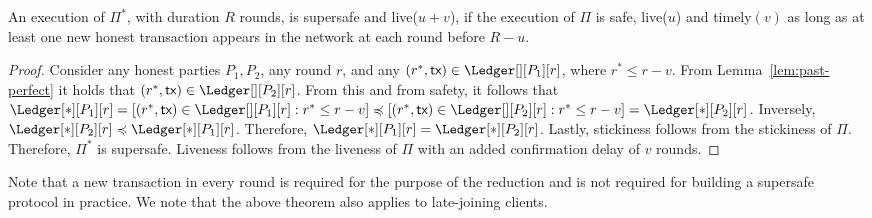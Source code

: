 \begin{theorem} \label{thm:timeliness-to-supersafety}
  An execution of $\Pi^*$, with duration $R$ rounds, is supersafe
  and live($u + v$), if the execution of
  $\Pi$ is safe, live($u$) and timely$(v)$
  as long as at least one new honest transaction appears in the
  network at each round before $R - u$.
\end{theorem}
\begin{proof}
  Consider any honest parties $P_1,P_2$, any round $r$, and any
  $(r^*, \tx) \in \Ledger[][P_1][r]$, where $r^* \leq r - v$.
  From Lemma~\ref{lem:past-perfect} it holds that
  $(r^*, \tx) \in \Ledger[][P_2][r]$.
  From this and from safety, it follows that
  $\Ledger[*][P_1][r] = [(r^*, \tx) \in \Ledger[][P_1][r]: r^* \leq r - v] \preccurlyeq
  [(r^*, \tx) \in \Ledger[][P_2][r]: r^* \leq r - v] = \Ledger[*][P_2][r]$.
  Inversely, $\Ledger[*][P_2][r] \preccurlyeq \Ledger[*][P_1][r]$.
  Therefore, $\Ledger[*][P_1][r] = \Ledger[*][P_2][r]$.
  Lastly, stickiness follows from the stickiness of $\Pi$.
  Therefore, $\Pi^*$ is supersafe.
  Liveness follows from the liveness of $\Pi$ with an added
  confirmation delay of $v$ rounds.
  \Qed
\end{proof}

Note that a new transaction in every round is required for the purpose of the reduction and is not required for building a supersafe protocol in practice.
We note that the above theorem also applies to late-joining clients.

